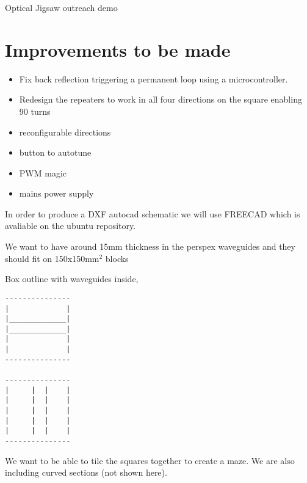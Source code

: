 \documentclass[12pt]{article}
\begin{document}
Optical Jigsaw outreach demo

\section{Improvements to be made}

\begin{itemize}
	\item Fix back reflection triggering a permanent loop using a microcontroller.
	\item Redesign the repeaters to work in all four directions on the square enabling 90 \degree turns 
	\item reconfigurable directions
	\item button to autotune
	\item PWM magic
	\item mains power supply 
\end{itemize}



In order to produce a DXF autocad schematic we will use FREECAD which is avaliable on the ubuntu repository.

We want to have around 15mm thickness in the perspex waveguides and they should fit on 150x150mm$^2$ blocks

Box outline with waveguides inside, 
\begin{verbatim}
---------------
|             |
|_____________|
|_____________| 
|             |
|             |
---------------

---------------
|     |  |    |
|     |  |    |
|     |  |    | 
|     |  |    |
|     |  |    |
---------------

\end{verbatim}


We want to be able to tile the squares together to create a maze. We are also including curved sections (not shown here).
\end{document}
